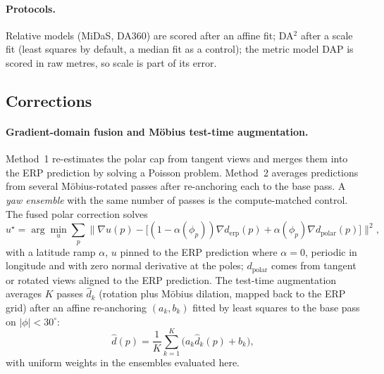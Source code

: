 \documentclass{article}
\begin{document}
\paragraph{Protocols.} Relative models (MiDaS, DA360) are scored after an affine fit; DA$^2$ after a scale fit (least squares by default, a median fit as a control); the metric model DAP is scored in raw metres, so scale is part of its error.

\subsection{Corrections}
\paragraph{Gradient-domain fusion and M\"obius test-time augmentation.} Method~1 re-estimates the polar cap from tangent views and merges them into the ERP prediction by solving a Poisson problem. Method~2 averages predictions from several M\"obius-rotated passes after re-anchoring each to the base pass. A \emph{yaw ensemble} with the same number of passes is the compute-matched control. The fused polar correction solves
\begin{equation}
u^\star=\arg\min_u\sum_p\big\|\nabla u(p)-\big[(1-\alpha(\phi_p))\nabla d_{\mathrm{erp}}(p)+\alpha(\phi_p)\nabla d_{\mathrm{polar}}(p)\big]\big\|^2,
\end{equation}
with a latitude ramp $\alpha$, $u$ pinned to the ERP prediction where $\alpha=0$, periodic in longitude and with zero normal derivative at the poles; $d_{\mathrm{polar}}$ comes from tangent or rotated views aligned to the ERP prediction. The test-time augmentation averages $K$ passes $\hat d_k$ (rotation plus M\"obius dilation, mapped back to the ERP grid) after an affine re-anchoring $(a_k,b_k)$ fitted by least squares to the base pass on $|\phi|<30^\circ$:
\begin{equation}
\hat d(p)=\frac{1}{K}\sum_{k=1}^{K}\big(a_k\hat d_k(p)+b_k\big),
\end{equation}
with uniform weights in the ensembles evaluated here.
\end{document}
